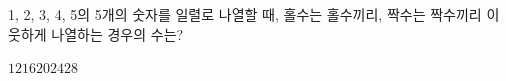 1, 2, 3, 4, 5의 5개의 숫자를 일렬로 나열할 때, 홀수는 홀수끼리, 짝수는 짝수끼리 이웃하게 나열하는 경우의 수는?
\begin{choices32}{$12$}{$16$}{$20$}{$24$}{$28$}\end{choices32}
